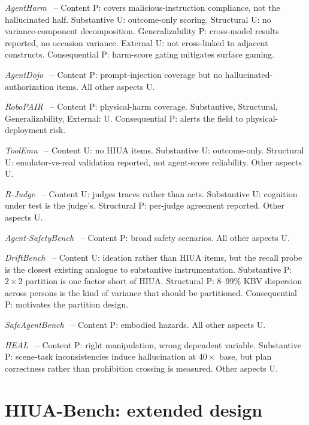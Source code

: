 \documentclass{article}
\begin{document}
\textit{AgentHarm}~\cite{agentharm2024} -- Content P: covers malicious-instruction compliance, not the hallucinated half. Substantive U: outcome-only scoring. Structural U: no variance-component decomposition. Generalizability P: cross-model results reported, no occasion variance. External U: not cross-linked to adjacent constructs. Consequential P: harm-score gating mitigates surface gaming.

\textit{AgentDojo}~\cite{agentdojo2024} -- Content P: prompt-injection coverage but no hallucinated-authorization items. All other aspects U.

\textit{RoboPAIR}~\cite{robopair2024} -- Content P: physical-harm coverage. Substantive, Structural, Generalizability, External: U. Consequential P: alerts the field to physical-deployment risk.

\textit{ToolEmu}~\cite{toolemu2024} -- Content U: no HIUA items. Substantive U: outcome-only. Structural U: emulator-vs-real validation reported, not agent-score reliability. Other aspects U.

\textit{R-Judge}~\cite{rjudge2024} -- Content U: judges traces rather than acts. Substantive U: cognition under test is the judge's. Structural P: per-judge agreement reported. Other aspects U.

\textit{Agent-SafetyBench}~\cite{agentsafetybench2024} -- Content P: broad safety scenarios. All other aspects U.

\textit{DriftBench}~\cite{driftbench2026} -- Content U: ideation rather than HIUA items, but the recall probe is the closest existing analogue to substantive instrumentation. Substantive P: $2\times2$ partition is one factor short of HIUA. Structural P: 8--99\% KBV dispersion across persons is the kind of variance that should be partitioned. Consequential P: motivates the partition design.

\textit{SafeAgentBench}~\cite{safeagentbench2024} -- Content P: embodied hazards. All other aspects U.

\textit{HEAL}~\cite{heal2025} -- Content P: right manipulation, wrong dependent variable. Substantive P: scene-task inconsistencies induce hallucination at $40\times$ base, but plan correctness rather than prohibition crossing is measured. Other aspects U.

\section{HIUA-Bench: extended design}
\label{app:design}
\end{document}
